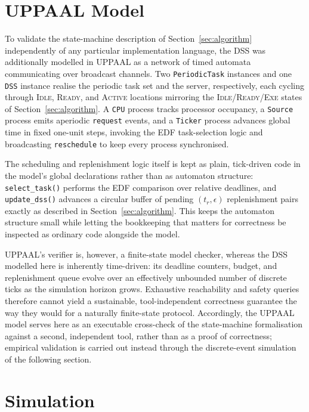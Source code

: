 \documentclass[conference]{IEEEtran}
\begin{document}
    \section{UPPAAL Model}
    \label{sec:uppaal}

    To validate the state-machine description of Section~\ref{sec:algorithm} independently of any particular implementation language, the DSS was additionally modelled in UPPAAL as a network of timed automata communicating over broadcast channels. Two \texttt{PeriodicTask} instances and one \texttt{DSS} instance realise the periodic task set and the server, respectively, each cycling through \textsc{Idle}, \textsc{Ready}, and \textsc{Active} locations mirroring the \textsc{Idle}/\textsc{Ready}/\textsc{Exe} states of Section~\ref{sec:algorithm}. A \texttt{CPU} process tracks processor occupancy, a \texttt{Source} process emits aperiodic \texttt{request} events, and a \texttt{Ticker} process advances global time in fixed one-unit steps, invoking the EDF task-selection logic and broadcasting \texttt{reschedule} to keep every process synchronised.

    The scheduling and replenishment logic itself is kept as plain, tick-driven code in the model's global declarations rather than as automaton structure: \texttt{select\_task()} performs the EDF comparison over relative deadlines, and \texttt{update\_dss()} advances a circular buffer of pending $(t_r, \epsilon)$ replenishment pairs exactly as described in Section~\ref{sec:algorithm}. This keeps the automaton structure small while letting the bookkeeping that matters for correctness be inspected as ordinary code alongside the model.

    UPPAAL's verifier is, however, a finite-state model checker, whereas the DSS modelled here is inherently time-driven: its deadline counters, budget, and replenishment queue evolve over an effectively unbounded number of discrete ticks as the simulation horizon grows. Exhaustive reachability and safety queries therefore cannot yield a sustainable, tool-independent correctness guarantee the way they would for a naturally finite-state protocol. Accordingly, the UPPAAL model serves here as an executable cross-check of the state-machine formalisation against a second, independent tool, rather than as a proof of correctness; empirical validation is carried out instead through the discrete-event simulation of the following section.


    \section{Simulation}
    \label{sec:simulation}
\end{document}
